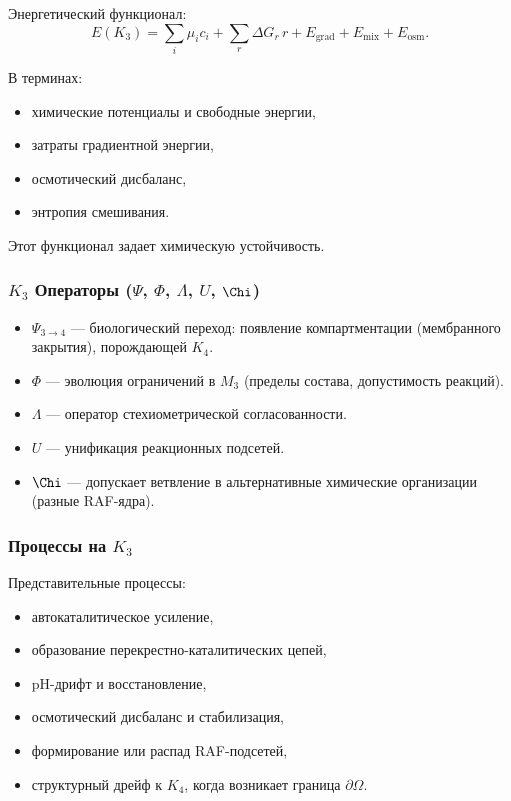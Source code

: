 Энергетический функционал:
\[
E(K_3) =
\sum_i \mu_i c_i +
\sum_r \Delta G_r\, r +
E_{\mathrm{grad}} + E_{\mathrm{mix}} + E_{\mathrm{osm}}.
\]

В терминах:
\begin{itemize}
    \item химические потенциалы и свободные энергии,
    \item затраты градиентной энергии,
    \item осмотический дисбаланс,
    \item энтропия смешивания.
\end{itemize}

Этот функционал задает химическую устойчивость.

\subsubsection{\texorpdfstring{$K_3$}{K_3} Операторы (\texorpdfstring{$\Psi$}{\Psi}, \texorpdfstring{$\Phi$}{\Phi}, \texorpdfstring{$\Lambda$}{\Lambda}, \texorpdfstring{$U$}{U}, \texorpdfstring{$\Chi$}{\Chi})}

\begin{itemize}
    \item $\Psi_{3\to4}$ — биологический переход: появление
          компартментации (мембранного закрытия), порождающей $K_4$.
    \item $\Phi$ — эволюция ограничений в $M_3$ (пределы состава,
          допустимость реакций).
    \item $\Lambda$ — оператор стехиометрической согласованности.
    \item $U$ — унификация реакционных подсетей.
    \item $\Chi$ — допускает ветвление в альтернативные химические
          организации (разные RAF-ядра).
\end{itemize}

\subsubsection{Процессы на \texorpdfstring{$K_3$}{K_3}}

Представительные процессы:
\begin{itemize}
    \item автокаталитическое усиление,
    \item образование перекрестно-каталитических цепей,
    \item pH-дрифт и восстановление,
    \item осмотический дисбаланс и стабилизация,
    \item формирование или распад RAF-подсетей,
    \item структурный дрейф к $K_4$, когда возникает граница $\partial\Omega$.
\end{itemize}

